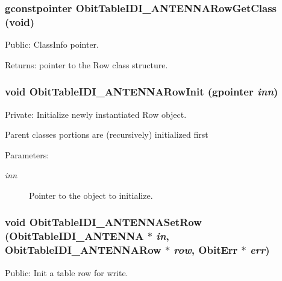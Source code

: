 \subsubsection{\setlength{\rightskip}{0pt plus 5cm}gconstpointer Obit\-Table\-IDI\_\-ANTENNARow\-Get\-Class (void)}\label{ObitTableIDI__ANTENNA_8c_a15}


Public: Class\-Info pointer. 

\begin{Desc}
\item[Returns:]pointer to the Row class structure. \end{Desc}
\subsubsection{\setlength{\rightskip}{0pt plus 5cm}void Obit\-Table\-IDI\_\-ANTENNARow\-Init (gpointer {\em inn})}\label{ObitTableIDI__ANTENNA_8c_a6}


Private: Initialize newly instantiated Row object. 

Parent classes portions are (recursively) initialized first \begin{Desc}
\item[Parameters:]
\begin{description}
\item[{\em inn}]Pointer to the object to initialize. \end{description}
\end{Desc}
\subsubsection{\setlength{\rightskip}{0pt plus 5cm}void Obit\-Table\-IDI\_\-ANTENNASet\-Row ({\bf Obit\-Table\-IDI\_\-ANTENNA} $\ast$ {\em in}, {\bf Obit\-Table\-IDI\_\-ANTENNARow} $\ast$ {\em row}, {\bf Obit\-Err} $\ast$ {\em err})}\label{ObitTableIDI__ANTENNA_8c_a23}


Public: Init a table row for write. 

